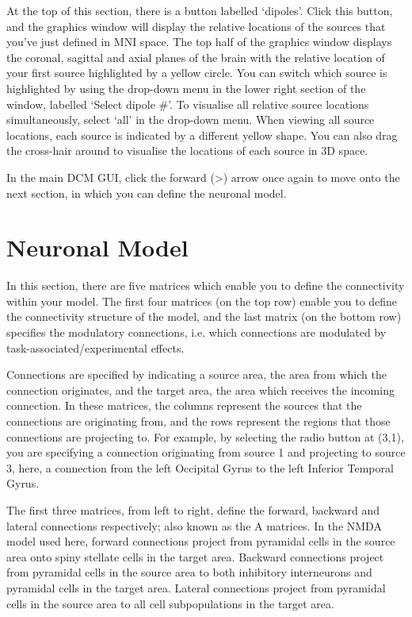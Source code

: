At the top of this section, there is a button labelled `dipoles'. Click
this button, and the graphics window will display the relative locations
of the sources that you've just defined in MNI space. The top half of
the graphics window displays the coronal, sagittal and axial planes of
the brain with the relative location of your first source highlighted by
a yellow circle. You can switch which source is highlighted by using the
drop-down menu in the lower right section of the window, labelled
`Select dipole \#'. To visualise all relative source locations
simultaneously, select `all' in the drop-down menu. When viewing all
source locations, each source is indicated by a different yellow shape.
You can also drag the cross-hair around to visualise the locations of
each source in 3D space.

In the main DCM GUI, click the forward (\textgreater{}) arrow once again
to move onto the next section, in which you can define the neuronal
model.

\section{Neuronal Model}

In this section, there are five matrices which enable you to define the
connectivity within your model. The first four matrices (on the top row)
enable you to define the connectivity structure of the model, and the
last matrix (on the bottom row) specifies the modulatory connections,
i.e. which connections are modulated by task-associated/experimental
effects.

Connections are specified by indicating a source area, the area from
which the connection originates, and the target area, the area which
receives the incoming connection. In these matrices, the columns
represent the sources that the connections are originating from, and the
rows represent the regions that those connections are projecting to. For
example, by selecting the radio button at (3,1), you are specifying a
connection originating from source 1 and projecting to source 3, here, a
connection from the left Occipital Gyrus to the left Inferior Temporal
Gyrus.

The first three matrices, from left to right, define the forward,
backward and lateral connections respectively; also known as the A
matrices. In the NMDA model used here, forward connections project from
pyramidal cells in the source area onto spiny stellate cells in the
target area. Backward connections project from pyramidal cells in the
source area to both inhibitory interneurons and pyramidal cells in the
target area. Lateral connections project from pyramidal cells in the
source area to all cell subpopulations in the target area.

